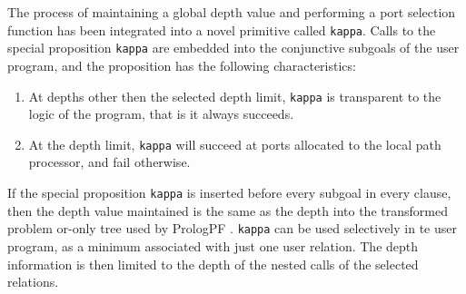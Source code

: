 The process of maintaining a global depth value and performing a port selection
function has been integrated into a novel primitive called \texttt{kappa}.  Calls
to the special proposition \texttt{kappa} are embedded into the 
conjunctive subgoals of the user program, and
the proposition has the following characteristics:
\begin{enumerate}
\item{At depths other then the selected depth limit, \texttt{kappa} is transparent to
  the logic of the program, that is it always succeeds.}
\item{At the depth limit, \texttt{kappa} will succeed at ports allocated to the local
  path processor, and fail otherwise.}
\end{enumerate}

If the special proposition \texttt{kappa} is inserted before every subgoal in every
clause, then the depth value maintained is the same as the depth into the transformed
problem or-only tree used by PrologPF \cite{Sar95}.  \texttt{kappa} can be used
selectively in te user program, as a minimum associated with just one user relation.
The depth information is then limited to the depth of the nested calls of the
selected relations.


